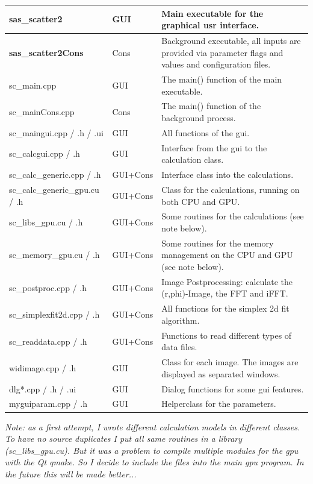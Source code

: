 \documentclass[11pt]{article} %
\begin{document}
\begin{longtable}{|L{4.5cm}|C{1.8cm}|L{10.9cm}|}
\hline
{\bf sas\_scatter2} & {\small GUI} & Main executable for the graphical usr interface. \\ \hline
{\bf sas\_scatter2Cons} & {\small Cons} & Background executable, all inputs are provided via parameter flags and values and configuration files. \\ \hline
sc\_main.cpp & {\small GUI} & The main() function of the main executable. \\ \hline
sc\_mainCons.cpp & {\small Cons} & The main() function of the background process. \\ \hline
sc\_maingui.cpp / .h / .ui & {\small GUI} & All functions of the gui. \\ \hline
sc\_calcgui.cpp / .h & {\small GUI} & Interface from the gui to the calculation class. \\ \hline
sc\_calc\_generic.cpp / .h & {\small GUI+Cons} & Interface class into the calculations. \\ \hline
sc\_calc\_generic\_gpu.cu / .h & {\small GUI+Cons} & Class for the calculations, running on both CPU and GPU. \\ \hline
sc\_libs\_gpu.cu / .h & {\small GUI+Cons} & Some routines for the calculations (see note below). \\ \hline
sc\_memory\_gpu.cu / .h & {\small GUI+Cons} & Some routines for the memory management on the CPU and GPU (see note below). \\ \hline
sc\_postproc.cpp / .h & {\small GUI+Cons} & Image Postprocessing: calculate the (r,phi)-Image, the FFT and iFFT. \\ \hline
sc\_simplexfit2d.cpp / .h & {\small GUI+Cons} & All functions for the simplex 2d fit algorithm. \\ \hline
sc\_readdata.cpp / .h & {\small GUI+Cons} & Functions to read different types of data files. \\ \hline
widimage.cpp / .h & {\small GUI} & Class for each image. The images are displayed as separated windows. \\ \hline
dlg*.cpp / .h / .ui & {\small GUI} & Dialog functions for some gui features. \\ \hline
myguiparam.cpp / .h & {\small GUI} & Helperclass for the parameters. \\ \hline
\end{longtable}
{\it Note: as a first attempt, I wrote different calculation models in different classes. To have no source duplicates I put all same routines in a library (sc\_libs\_gpu.cu). But it was a problem to compile multiple modules for the gpu with the Qt qmake. So I decide to include the files into the main gpu program. In the future this will be made better...}
\end{document}

